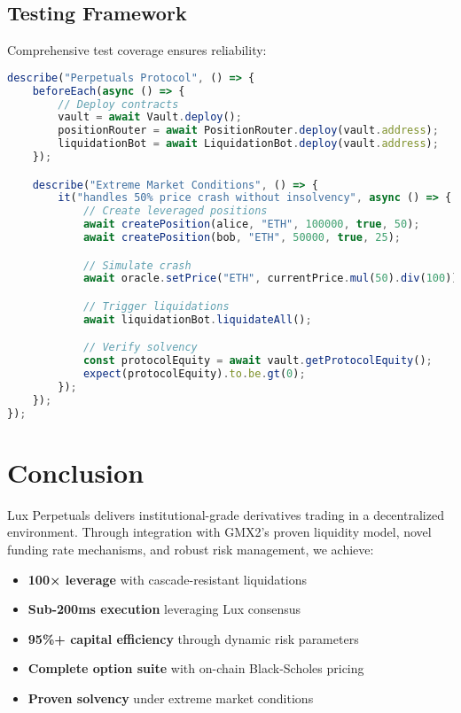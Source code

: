 \documentclass[11pt,a4paper]{article}
\begin{document}
\subsection{Testing Framework}

Comprehensive test coverage ensures reliability:

\begin{lstlisting}[language=JavaScript, caption={Integration Test Suite}]
describe("Perpetuals Protocol", () => {
    beforeEach(async () => {
        // Deploy contracts
        vault = await Vault.deploy();
        positionRouter = await PositionRouter.deploy(vault.address);
        liquidationBot = await LiquidationBot.deploy(vault.address);
    });

    describe("Extreme Market Conditions", () => {
        it("handles 50% price crash without insolvency", async () => {
            // Create leveraged positions
            await createPosition(alice, "ETH", 100000, true, 50);
            await createPosition(bob, "ETH", 50000, true, 25);

            // Simulate crash
            await oracle.setPrice("ETH", currentPrice.mul(50).div(100));

            // Trigger liquidations
            await liquidationBot.liquidateAll();

            // Verify solvency
            const protocolEquity = await vault.getProtocolEquity();
            expect(protocolEquity).to.be.gt(0);
        });
    });
});
\end{lstlisting}

\section{Conclusion}

Lux Perpetuals delivers institutional-grade derivatives trading in a decentralized environment. Through integration with GMX2's proven liquidity model, novel funding rate mechanisms, and robust risk management, we achieve:

\begin{itemize}
    \item \textbf{100× leverage} with cascade-resistant liquidations
    \item \textbf{Sub-200ms execution} leveraging Lux consensus
    \item \textbf{95\%+ capital efficiency} through dynamic risk parameters
    \item \textbf{Complete option suite} with on-chain Black-Scholes pricing
    \item \textbf{Proven solvency} under extreme market conditions
\end{itemize}
\end{document}

